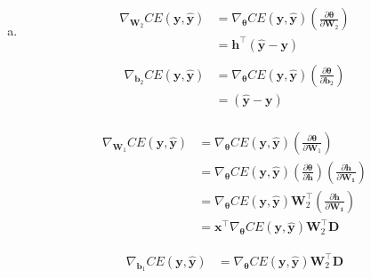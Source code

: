 \documentclass[19pt]{extarticle}
\begin{document}
\begin{enumerate}[a)]
\item 
\begin{equation*}\begin{split}
\nabla_{\bm{W}_2}CE(\bm{y},\hat{\bm{y}}) &= \nabla_{\bm{\theta}} CE(\bm{y},\hat{\bm{y}})   (\frac{\partial \bm{\theta}}{\partial \bm{W}_2})\\
&=\bm{h}^\top (\hat{\bm{y}} - \bm{y}) \\
   \end{split}\end{equation*}
\begin{equation*}\begin{split}
\nabla_{\bm{b}_2}CE(\bm{y},\hat{\bm{y}}) &= \nabla_{\bm{\theta}} CE(\bm{y},\hat{\bm{y}})   (\frac{\partial \bm{\theta}}{\partial \bm{b}_2})\\
&= (\hat{\bm{y}} - \bm{y}) \\
   \end{split}\end{equation*}

\begin{equation*}\begin{split}
\nabla_{\bm{W}_1}CE(\bm{y},\hat{\bm{y}}) &= \nabla_{\bm{\theta}} CE(\bm{y},\hat{\bm{y}})   (\frac{\partial \bm{\theta}}{\partial \bm{W}_1})\\
&=\nabla_{\bm{\theta}} CE(\bm{y},\hat{\bm{y}})   (\frac{\partial \bm{\theta}}{\partial \bm{h}}) (\frac{\partial \bm{h}}{\partial \bm{\bm{W}_1}})\\   
&= \nabla_{\bm{\theta}} CE(\bm{y},\hat{\bm{y}})   \bm{W}_2^\top  (\frac{\partial \bm{h}}{\partial \bm{\bm{W}_1}})\\   
&= \bm{x}^\top \nabla_{\bm{\theta}} CE(\bm{y},\hat{\bm{y}})   \bm{W}_2^\top  \bm{D}
\end{split}\end{equation*}

\begin{equation*}\begin{split}
\nabla_{\bm{b}_1}CE(\bm{y},\hat{\bm{y}}) &= \nabla_{\bm{\theta}} CE(\bm{y},\hat{\bm{y}})   \bm{W}_2^\top  \bm{D}
\end{split}\end{equation*}

\end{enumerate}
\end{document}
